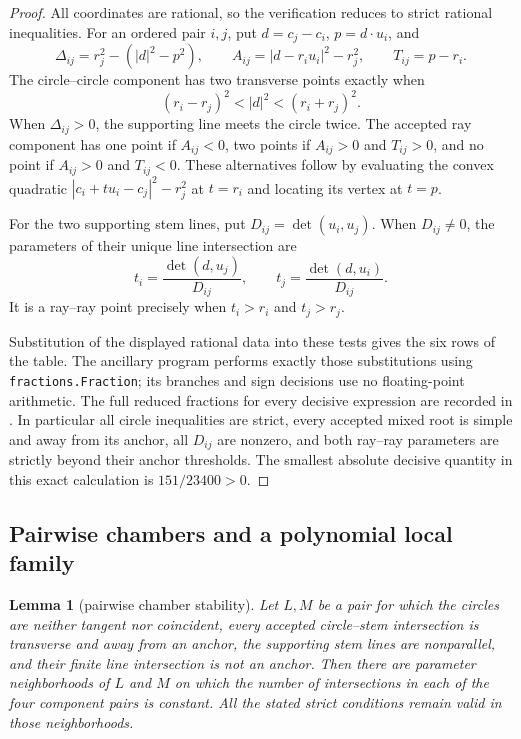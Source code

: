 \documentclass[11pt]{article}
\theoremstyle{plain}
\newtheorem{lemma}[theorem]{Lemma}
\theoremstyle{definition}
\theoremstyle{remark}
\newcommand{\1}{\mathbf 1}
\begin{document}
\begin{proof}
All coordinates are rational, so the verification reduces to strict rational
inequalities.  For an ordered pair $i,j$, put $d=c_j-c_i$,
$p=d\cdot u_i$, and
\[
 \Delta_{ij}=r_j^2-(|d|^2-p^2),\qquad
 A_{ij}=|d-r_i u_i|^2-r_j^2,\qquad
 T_{ij}=p-r_i.
\]
The circle--circle component has two transverse points exactly when
\[
 (r_i-r_j)^2<|d|^2<(r_i+r_j)^2.
\]
When $\Delta_{ij}>0$, the supporting line meets the circle twice.  The
accepted ray component has one point if $A_{ij}<0$, two points if
$A_{ij}>0$ and $T_{ij}>0$, and no point if $A_{ij}>0$ and $T_{ij}<0$.
These alternatives follow by evaluating the convex quadratic
$|c_i+t u_i-c_j|^2-r_j^2$ at $t=r_i$ and locating its vertex at $t=p$.

For the two supporting stem lines, put
$D_{ij}=\det(u_i,u_j)$.  When $D_{ij}\ne0$, the parameters of their unique
line intersection are
\[
 t_i=\frac{\det(d,u_j)}{D_{ij}},\qquad
 t_j=\frac{\det(d,u_i)}{D_{ij}}.
\]
It is a ray--ray point precisely when $t_i>r_i$ and $t_j>r_j$.

Substitution of the displayed rational data into these tests gives the six
rows of the table.  The ancillary program
 performs exactly those
substitutions using \texttt{fractions.Fraction}; its branches and sign
decisions use no floating-point arithmetic.  The full reduced fractions for
every decisive expression are recorded in
.  In particular all
circle inequalities are strict, every accepted mixed root is simple and away
from its anchor, all $D_{ij}$ are nonzero, and both ray--ray parameters are
strictly beyond their anchor thresholds.  The smallest absolute decisive
quantity in this exact calculation is $151/23400>0$.
\end{proof}

\subsection{Pairwise chambers and a polynomial local family}

\begin{lemma}[pairwise chamber stability]\label{lem:chamber}
Let $L,M$ be a pair for which the circles are neither tangent nor coincident,
every accepted circle--stem intersection is transverse and away from an
anchor, the supporting stem lines are nonparallel, and their finite line
intersection is not an anchor.  Then there are parameter neighborhoods of
$L$ and $M$ on which the number of intersections in each of the four
component pairs is constant.  All the stated strict conditions remain valid
in those neighborhoods.
\end{lemma}
\end{document}
